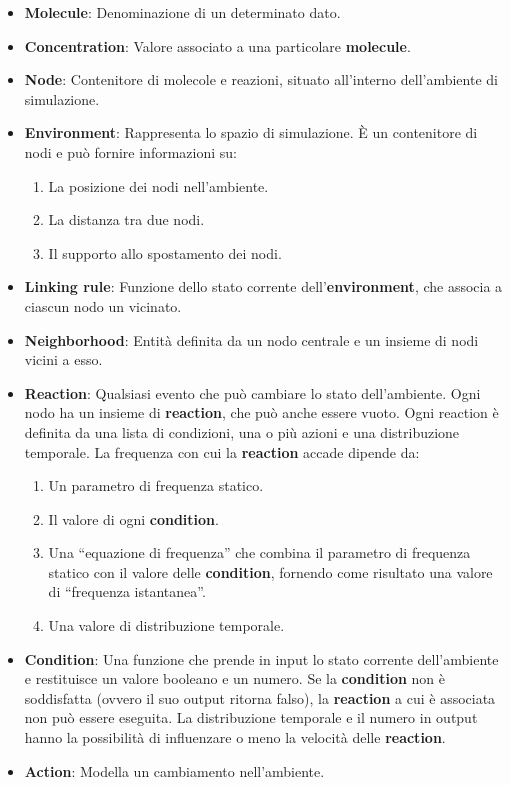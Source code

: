 \begin{itemize}
	\item \textbf{Molecule}:  Denominazione di un determinato dato.
	\item \textbf{Concentration}:  Valore associato a una particolare \textbf{molecule}. 
	\item \textbf{Node}: Contenitore di molecole e reazioni, situato all'interno dell'ambiente di simulazione.
	\item \textbf{Environment}: Rappresenta lo spazio di simulazione. È un contenitore di nodi e può fornire informazioni su:
	\begin{enumerate}
		\item La posizione dei nodi nell'ambiente.
		\item La distanza tra due nodi.
		\item Il supporto allo spostamento dei nodi.
	\end{enumerate}
	\item \textbf{Linking rule}: Funzione dello stato corrente dell'\textbf{environment}, che associa a ciascun nodo un vicinato.
	\item \textbf{Neighborhood}: Entità definita da un nodo centrale e un insieme di nodi vicini a esso.
	\item \textbf{Reaction}\label{item:reactions}: Qualsiasi evento che può cambiare lo stato dell'ambiente. Ogni nodo ha un insieme di \textbf{reaction}, che può anche essere vuoto. Ogni reaction è definita da una lista di condizioni, una o più azioni e una distribuzione temporale. La frequenza con cui la \textbf{reaction} accade dipende da:
		\begin{enumerate}
		\item Un parametro di frequenza statico.
		\item Il valore di ogni \textbf{condition}.
		\item Una ``equazione di frequenza'' che combina il parametro di frequenza statico con il valore delle \textbf{condition}, fornendo come risultato una valore di ``frequenza istantanea''.
		\item Una valore di distribuzione temporale.
	\end{enumerate}
	\item \textbf{Condition}: Una funzione che prende in input lo stato corrente dell'ambiente e restituisce un valore booleano e un numero. Se la \textbf{condition} non è soddisfatta (ovvero il suo output ritorna falso), la \textbf{reaction} a cui è associata non può essere eseguita. La distribuzione temporale e il numero in output hanno la possibilità di influenzare o meno la velocità delle \textbf{reaction}.
	\item \textbf{Action}: Modella un cambiamento nell'ambiente.
\end{itemize}

